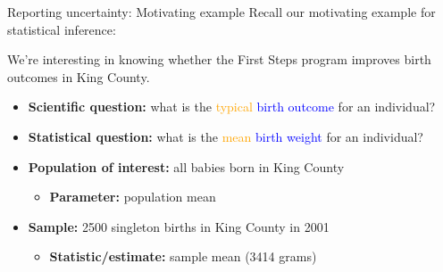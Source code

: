 \documentclass[10pt,t]{beamer}
\begin{document}
\begin{frame}{Reporting uncertainty: Motivating example}
Recall our motivating example for statistical inference:

\vspace{0.3cm}

We're interesting in knowing whether the First Steps program improves birth outcomes in King County.

\vspace{0.1cm}

\begin{itemize}
	\item \textbf{Scientific question:} what is the \textcolor{orange}{typical}  \textcolor{blue}{birth outcome} for an individual?
	\item \textbf{Statistical question:} what is the \textcolor{orange}{mean} \textcolor{blue}{birth weight} for an individual?
	\item \textbf{Population of interest:} all babies born in King County
	\begin{itemize}
		\item \textbf{Parameter:} population mean
	\end{itemize}
	\item \textbf{Sample:} 2500 singleton births in King County in 2001
	\begin{itemize}
		\item \textbf{Statistic/estimate:} sample mean (3414 grams)
	\end{itemize}
\end{itemize}

\end{frame}
\end{document}
